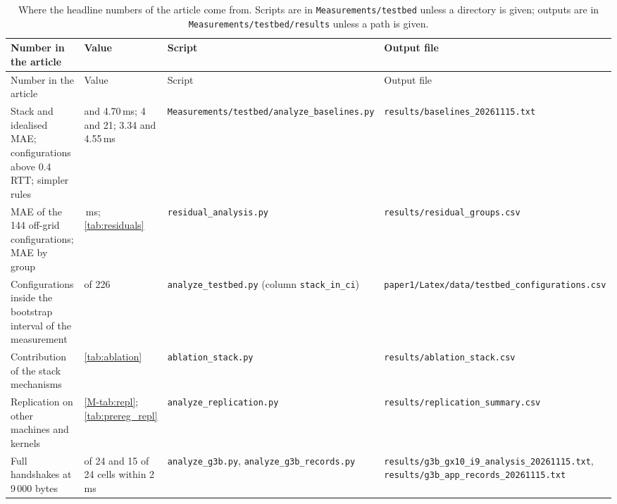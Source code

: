 \documentclass[preprint,12pt]{elsarticle}
\newcommand{\ms}{\,ms\xspace}
\begin{document}
\begin{footnotesize}\sloppy
\setlength{\tabcolsep}{3pt}\renewcommand{\arraystretch}{1.1}
\begin{longtable}{@{}>{\raggedright\arraybackslash}p{}>{\raggedright\arraybackslash}p{}>{\raggedright\arraybackslash}p{}>{\raggedright\arraybackslash}p{}@{}}
\caption{Where the headline numbers of the article come from. Scripts are in \texttt{Measurements/testbed} unless a directory is given; outputs are in \texttt{Measurements/testbed/results} unless a path is given.}\label{tab:repro}\\
\toprule
Number in the article & Value & Script & Output file \\
\midrule\endfirsthead
\toprule
Number in the article & Value & Script & Output file \\
\midrule\endhead
\bottomrule\endlastfoot
Stack and idealised MAE; configurations above 0.4\,RTT; simpler rules & 1.65 and 4.70\ms; 4 and 21; 3.34 and 4.55\ms & \texttt{Measurements/\allowbreak testbed/\allowbreak analyze\_\allowbreak baselines.py} & \texttt{results/\allowbreak baselines\_\allowbreak 20261115.txt} \\
MAE of the 144 off-grid configurations; MAE by group & 2.04\ms; \cref{tab:residuals} & \texttt{residual\_\allowbreak analysis.py} & \texttt{results/\allowbreak residual\_\allowbreak groups.csv} \\
Configurations inside the bootstrap interval of the measurement & 46 of 226 & \texttt{analyze\_\allowbreak testbed.py} (column \texttt{stack\_\allowbreak in\_\allowbreak ci}) & \texttt{paper1/\allowbreak Latex/\allowbreak data/\allowbreak testbed\_\allowbreak configurations.csv} \\
Contribution of the stack mechanisms & \cref{tab:ablation} & \texttt{ablation\_\allowbreak stack.py} & \texttt{results/\allowbreak ablation\_\allowbreak stack.csv} \\
Replication on other machines and kernels & \cref{M-tab:repl}; \cref{tab:prereg_repl} & \texttt{analyze\_\allowbreak replication.py} & \texttt{results/\allowbreak replication\_\allowbreak summary.csv} \\
Full handshakes at 9\,000 bytes & 2 of 24 and 15 of 24 cells within 2\ms & \texttt{analyze\_\allowbreak g3b.py}, \texttt{analyze\_\allowbreak g3b\_\allowbreak records.py} & \texttt{results/\allowbreak g3b\_\allowbreak gx10\_\allowbreak i9\_\allowbreak analysis\_\allowbreak 20261115.txt}, \texttt{results/\allowbreak g3b\_\allowbreak app\_\allowbreak records\_\allowbreak 20261115.txt} \\

\end{longtable}
\end{footnotesize}
\end{document}
